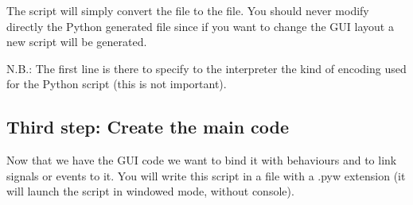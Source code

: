 \documentclass[english, 12 pt, openany, oneside]{book}
\begin{document}
The script will simply convert the  file to the  file. You should never modify directly the Python generated file since if you want to change the GUI layout a new script will be generated.

N.B.: The first line is there to specify to the interpreter the kind of encoding used for the Python script (this is not important).

\subsection{Third step: Create the main code}
Now that we have the GUI code we want to bind it with behaviours and to link signals or events to it. You will write this script in a file with a .pyw extension (it will launch the script in windowed mode, without console).
\end{document}
